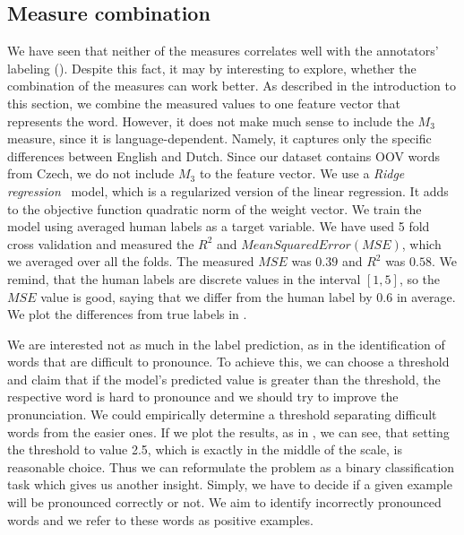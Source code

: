 \subsection{Measure combination}
\label{mcomb}
We have seen that neither of the measures correlates well with the annotators' labeling ().
Despite this fact, it may by interesting to explore, whether the combination of the measures can work better.
As described in the introduction to this section, we combine the measured values to one feature vector that represents the word.
However, it does not make much sense to include the $M_3$ measure, since it is language-dependent.
Namely, it captures only the specific differences between English and Dutch.
Since our dataset contains OOV words from Czech, we do not include $M_3$ to the feature vector.
We use a \textit{Ridge regression}~\cite{hoerl1970ridge} model, which is a regularized version of the linear regression.
It adds to the objective function quadratic norm of the weight vector.
We train the model using averaged human labels as a target variable.
We have used 5 fold cross validation and measured the $R^2$ and $Mean Squared Error (MSE)$, which we averaged over all the folds.
The measured $MSE$ was $0.39$ and $R^2$ was $0.58$.
We remind, that the human labels are discrete values in the interval $[1,5]$, so the $MSE$ value is good, saying that we differ from the human label by $0.6$ in average.
We plot the differences from true labels in .
\par
We are interested not as much in the label prediction, as in the identification of words that are difficult to pronounce.
To achieve this, we can choose a threshold and claim that if the model's predicted value is greater than the threshold, the respective word is hard to pronounce and we should try to improve the pronunciation.
We could empirically determine a threshold separating difficult words from the easier ones.
If we plot the results, as in , we can see, that setting the threshold to value 2.5, which is exactly in the middle of the scale, is reasonable choice.
Thus we can reformulate the problem as a binary classification task which gives us another insight.
Simply, we have to decide if a given example will be pronounced correctly or not.
We aim to identify incorrectly pronounced words and we refer to these words as positive examples.
